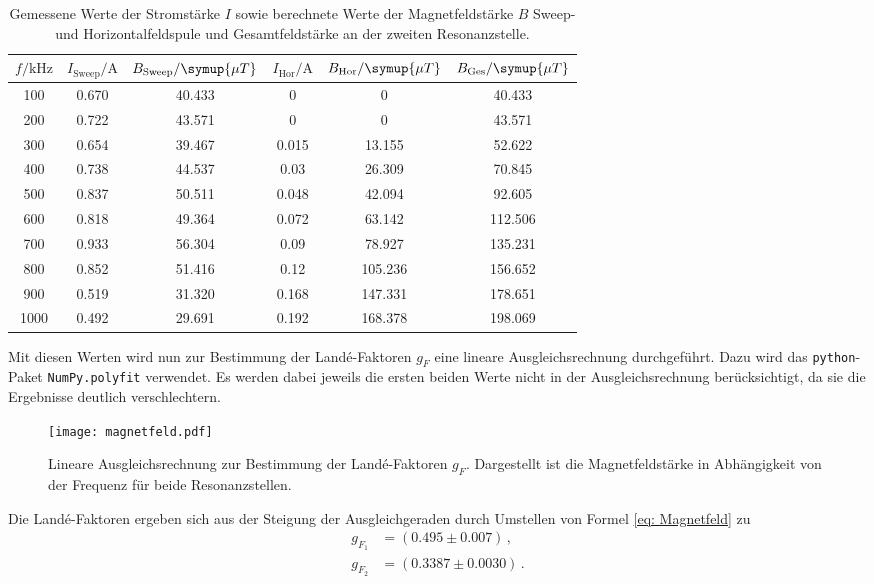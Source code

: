 \begin{table}[h]
    \centering
    \caption{Gemessene Werte der Stromstärke $I$ sowie berechnete Werte der Magnetfeldstärke $B$ Sweep- und Horizontalfeldspule und Gesamtfeldstärke an der zweiten Resonanzstelle.}
    \label{tab:atab2}
    \begin{tabular}{c c c c c c}
        \toprule
        {$f / \text{kHz}$} & {$I_{\text{Sweep}} / \text{A}$} & {$B_{\text{Sweep}} / \symup{\mu T}$} & {$I_{\text{Hor}} / \text{A}$} & {$B_{\text{Hor}} / \symup{\mu T}$} & {$B_{\text{Ges}} / \symup{\mu T}$} \\
        \midrule
        100  & 0.670 & 40.433 & 0     & 0       & 40.433 \\
        200  & 0.722 & 43.571 & 0     & 0       & 43.571 \\
        300  & 0.654 & 39.467 & 0.015 & 13.155  & 52.622 \\
        400  & 0.738 & 44.537 & 0.03  & 26.309  & 70.845 \\
        500  & 0.837 & 50.511 & 0.048 & 42.094  & 92.605 \\
        600  & 0.818 & 49.364 & 0.072 & 63.142  & 112.506 \\
        700  & 0.933 & 56.304 & 0.09  & 78.927  & 135.231 \\
        800  & 0.852 & 51.416 & 0.12  & 105.236 & 156.652 \\
        900  & 0.519 & 31.320 & 0.168 & 147.331 & 178.651 \\
        1000 & 0.492 & 29.691 & 0.192 & 168.378 & 198.069 \\
        \bottomrule
    \end{tabular}
\end{table}
\FloatBarrier
\noindent
Mit diesen Werten wird nun zur Bestimmung der Landé-Faktoren $g_F$ eine lineare Ausgleichsrechnung durchgeführt.
Dazu wird das \texttt{python}-Paket \texttt{NumPy.polyfit} verwendet. Es werden dabei jeweils die ersten beiden Werte
nicht in der Ausgleichsrechnung berücksichtigt, da sie die Ergebnisse deutlich verschlechtern. 
\FloatBarrier
\begin{figure}[h]
    \centering
    \texttt{[image: magnetfeld.pdf]}
    \caption{Lineare Ausgleichsrechnung zur Bestimmung der Landé-Faktoren $g_F$. Dargestellt ist die Magnetfeldstärke in Abhängigkeit von der Frequenz für beide Resonanzstellen.}
    \label{fig:afig1}
\end{figure}
\FloatBarrier
\noindent
Die Landé-Faktoren ergeben sich aus der Steigung der Ausgleichgeraden durch Umstellen von Formel \eqref{eq: Magnetfeld} zu
\begin{align*}
    g_{F_1} &= (0.495 \pm 0.007) \, ,\\
    g_{F_2} &= (0.3387  \pm 0.0030) \, .
\end{align*}


